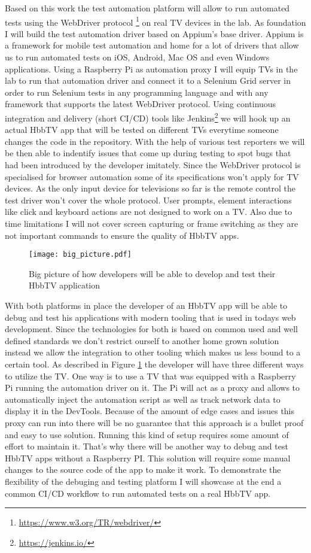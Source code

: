 Based on this work the test automation platform will allow to run automated tests using the WebDriver protocol
\footnote{\url{https://www.w3.org/TR/webdriver/}} on real TV devices in the lab. As foundation I will build the
test automation driver based on Appium's base driver. Appium is a framework for mobile test automation and home
for a lot of drivers that allow us to run automated tests on iOS, Android, Mac OS and even Windows applications.
Using a Raspberry Pi as automation proxy I will equip TVs in the lab to run that automation driver and connect
it to a Selenium Grid server in order to run Selenium tests in any programming language and with any framework
that supports the latest WebDriver protocol. Using continuous integration and delivery (short CI/CD) tools like
Jenkins\footnote{\url{https://jenkins.io/}} we will hook up an actual HbbTV app that will be tested on different
TVs everytime someone changes the code in the repository. With the help of various test reporters we will be then
able to indentify issues that come up during testing to spot bugs that had been introduced by the developer
imitately. Since the WebDriver protocol is specialised for browser automation some of its specifications won't
apply for TV devices. As the only input device for televisions so far is the remote control the test driver won't
cover the whole protocol. User prompts, element interactions like click and keyboard actions are not designed
to work on a TV. Also due to time limitations I will not cover screen capturing or frame switching as they are
not important commands to ensure the quality of HbbTV apps.

\begin{figure}[htb]
  \centering
  \texttt{[image: big\_picture.pdf]}
  \caption{Big picture of how developers will be able to develop and test their HbbTV application}\label{fig:bigpicture}
\end{figure}

With both platforms in place the developer of an HbbTV app will be able to debug and test his applications
with modern tooling that is used in todays web development. Since the technologies for both is based on
common used and well defined standards we don't restrict ourself to another home grown solution instead we
allow the integration to other tooling which makes us less bound to a certain tool. As described in Figure
\ref{fig:bigpicture} the developer will have three different ways to utilize the TV. One way is to use
a TV that was equipped with a Raspberry Pi running the automation driver on it. The Pi will act as a proxy
and allows to automatically inject the automation script as well as track network data to display it in the
DevTools. Because of the amount of edge cases and issues this proxy can run into there will be no guarantee
that this approach is a bullet proof and easy to use solution. Running this kind of setup requires some amount
of effort to maintain it. That's why there will be another way to debug and test HbbTV apps without a
Raspberry PI. This solution will require some manual changes to the source code of the app to make it work.
To demonstrate the flexibility of the debuging and testing platform I will showcase at the end a common
CI/CD workflow to run automated tests on a real HbbTV app.

